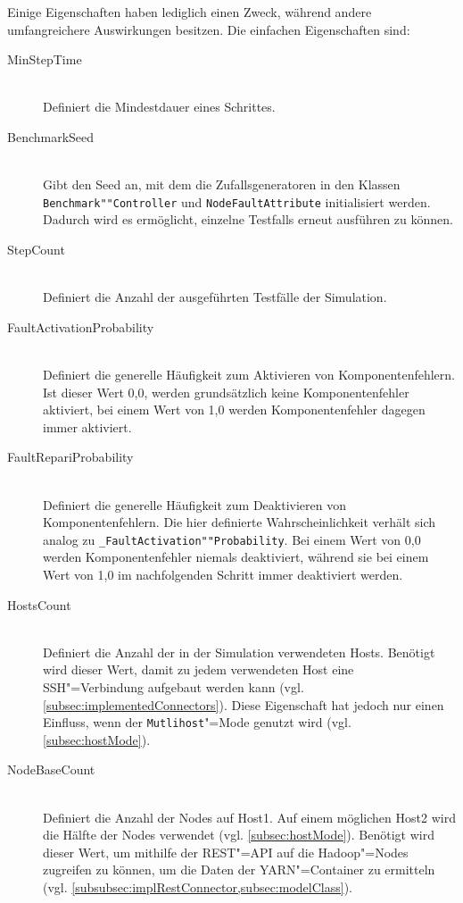 Einige Eigenschaften haben lediglich einen Zweck, während andere umfangreichere Auswirkungen besitzen.
Die einfachen Eigenschaften sind:

\begin{description}
    \item [MinStepTime] \hfill \\
        Definiert die Mindestdauer eines Schrittes.
        
    \item[BenchmarkSeed] \hfill \\
        Gibt den Seed an, mit dem die Zufallsgeneratoren in den Klassen \texttt{Benchmark""Controller} und \texttt{NodeFaultAttribute} initialisiert werden.
        Dadurch wird es ermöglicht, einzelne \glspl{Testfall} erneut ausführen zu können.
        
    \item[StepCount] \hfill \\
        Definiert die Anzahl der ausgeführten Testfälle der Simulation.
        
    \item[FaultActivationProbability] \hfill \\
        Definiert die generelle Häufigkeit zum Aktivieren von Komponentenfehlern.
        Ist dieser Wert 0,0, werden grundsätzlich keine Komponentenfehler aktiviert, bei einem Wert von 1,0 werden Komponentenfehler dagegen immer aktiviert.
        
    \item[FaultRepariProbability] \hfill \\
        Definiert die generelle Häufigkeit zum Deaktivieren von Komponentenfehlern.
        Die hier definierte Wahrscheinlichkeit verhält sich analog zu \texttt{\_FaultActivation""Probability}.
        Bei einem Wert von 0,0 werden Komponentenfehler niemals deaktiviert, während sie bei einem Wert von 1,0 im nachfolgenden Schritt immer deaktiviert werden.
        
    \item[HostsCount] \hfill \\
        Definiert die Anzahl der in der Simulation verwendeten Hosts.
        Benötigt wird dieser Wert, damit zu jedem verwendeten Host eine SSH"=Verbindung aufgebaut werden kann (vgl. \cref{subsec:implementedConnectors}).
        Diese Eigenschaft hat jedoch nur einen Einfluss, wenn der \texttt{Mutlihost}"=Mode genutzt wird (vgl. \cref{subsec:hostMode}).
        
    \item[NodeBaseCount] \hfill \\
        Definiert die Anzahl der Nodes auf Host1.
        Auf einem möglichen Host2 wird die Hälfte der Nodes verwendet (vgl. \cref{subsec:hostMode}).
        Benötigt wird dieser Wert, um mithilfe der \gls{REST}"=API auf die Hadoop"=Nodes zugreifen zu können, um die Daten der YARN"=Container zu ermitteln (vgl. \cref{subsubsec:implRestConnector,subsec:modelClass}).
        

\end{description}
